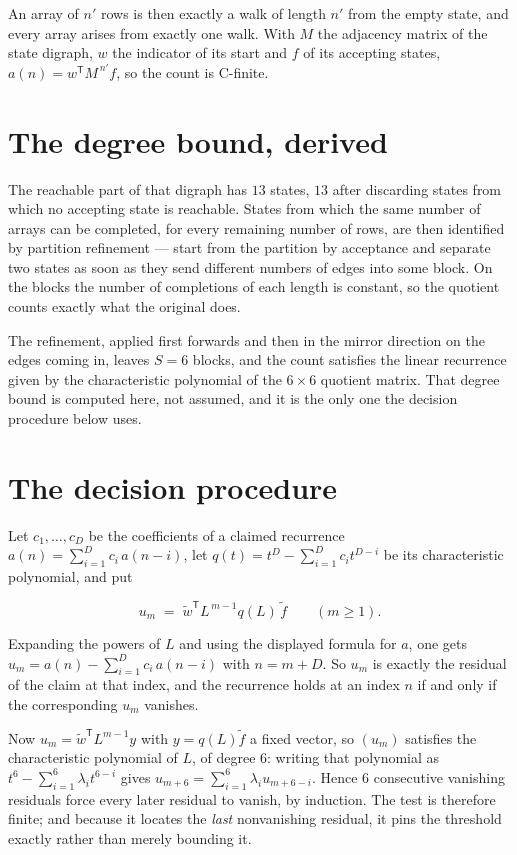 \documentclass[11pt]{article}
\theoremstyle{definition}
\begin{document}
An array of $n'$ rows is then exactly a walk of length $n'$ from the empty state, and every array arises from exactly one walk. With $M$ the adjacency matrix of the state digraph, $w$ the indicator of its start and $f$ of its accepting states, $a(n) = w^{\mathsf T}M^{\,n'}f$, so the count is C-finite.

\section{The degree bound, derived}

The reachable part of that digraph has $13$ states, $13$ after discarding states from which no accepting state is reachable. States from which the same number of arrays can be completed, for every remaining number of rows, are then identified by partition refinement --- start from the partition by acceptance and separate two states as soon as they send different numbers of edges into some block. On the blocks the number of completions of each length is constant, so the quotient counts exactly what the original does.

The refinement, applied first forwards and then in the mirror direction on the edges coming in, leaves $S = 6$ blocks, and the count satisfies the linear recurrence given by the characteristic polynomial of the $6 \times 6$ quotient matrix. That degree bound is computed here, not assumed, and it is the only one the decision procedure below uses.

\section{The decision procedure}

Let $c_1,\dots,c_D$ be the coefficients of a claimed recurrence $a(n) = \sum_{i=1}^{D} c_i\,a(n-i)$, let $q(t) = t^{D} - \sum_{i=1}^{D} c_i t^{D-i}$ be its characteristic polynomial, and put

\[u_m \;=\; \tilde w^{\mathsf T} L^{\,m-1} q(L)\,\tilde f \qquad (m \ge 1).\]

Expanding the powers of $L$ and using the displayed formula for $a$, one gets $u_m = a(n) - \sum_{i=1}^{D} c_i\,a(n-i)$ with $n = m + D$. So $u_m$ is exactly the residual of the claim at that index, and the recurrence holds at an index $n$ if and only if the corresponding $u_m$ vanishes.

Now $u_m = \tilde w^{\mathsf T} L^{m-1} y$ with $y = q(L)\tilde f$ a fixed vector, so $(u_m)$ satisfies the characteristic polynomial of $L$, of degree $6$: writing that polynomial as $t^{6} - \sum_{i=1}^{6} \lambda_i t^{6-i}$ gives $u_{m+6} = \sum_{i=1}^{6} \lambda_i u_{m+6-i}$. Hence $6$ consecutive vanishing residuals force every later residual to vanish, by induction. The test is therefore finite; and because it locates the {\itshape last} nonvanishing residual, it pins the threshold exactly rather than merely bounding it.
\end{document}
